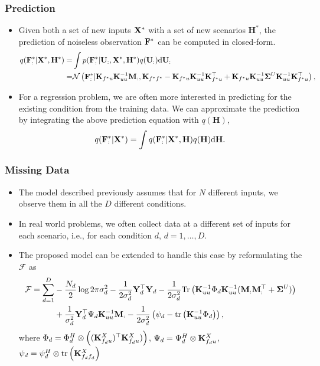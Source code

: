 \documentclass[aspectratio=169]{beamer}
\newcommand{\K}{\covarianceMatrix}
\newcommand{\yM}{\dataMatrix}
\newcommand{\fM}{\mappingFunctionMatrix}
\newcommand{\uM}{\inducingMatrix}
\newcommand{\xM}{\inputMatrix}
\newcommand{\mM}{\mathbf M}
\newcommand{\hM}{\mathbf H}
\newcommand{\sM}{\mathbf \Sigma}
\begin{document}
      \begin{frame}
    \frametitle{Prediction}
    \begin{itemize}
    \item Given both a set of new inputs $\xM^*$ with a set of new scenarios $\hM^*$, the prediction of noiseless observation $\fM^*$ can be computed in closed-form.
    \begin{align*}
q(\fM_{:}^* | \xM^*, \hM^*) =& \int p(\fM_{:}^* | \uM_{:},  \xM^*, \hM^*) q(\uM_{:}) \dif{\uM_{:}} \\
=& \gaussianDist{\fM_{:}^*}{\K_{f^* u}\K_{uu}^{-1}\mM_{:}}{\K_{f^*f^*}-\K_{f^*u}\K_{uu}^{-1}\K_{f^*u}^\top+\K_{f^* u}\K_{uu}^{-1}\sM^{U}\K_{uu}^{-1}\K_{f^* u}^\top},  
\end{align*}
    \item For a regression problem, we are often more interested in predicting for the existing condition from the training data. We can approximate the prediction by integrating the above prediction equation with $q(\hM)$,
\begin{align*}
q(\fM_{:}^* | \xM^*) = \int q(\fM_{:}^* | \xM^*, \hM) q(\hM) \dif{\hM}.
\end{align*}
  \end{itemize}
  \end{frame}

      \begin{frame}
    \frametitle{Missing Data}
    \begin{itemize}
    \item The model described previously assumes that for $N$ different inputs, we observe them in all the $D$ different conditions.
    \item In real world problems, we often collect data at a different set of inputs for each scenario, i.e., for each condition $d$, $d=1, \dots, D$.
    \item The proposed model can be extended to handle this case by reformulating the $\mathcal{F}$ as
\begin{align*}
\mathcal{F} = \sum_{d=1}^D
&-\frac{N_d}{2}\log 2\pi \sigma_d^2 -\frac{1}{2\sigma^2_d} \yM_d^\top\yM_d -\frac{1}{2\sigma^2_d}\Tr\left(\K^{-1}_{uu} \Phi_d \K^{-1}_{uu} (\mM_{:}\mM_{:}^\top+\sM^{U}) \right)  \nonumber\\
&+\frac{1}{\sigma^2_d}\yM_d^\top \Psi_d \K^{-1}_{uu} \mM_{:}  -\frac{1}{2\sigma^2_d} \left( \psi_d -\tr{\K^{-1}_{uu} \Phi_d} \right),
\end{align*}
where $\Phi_d = \Phi_d^H \otimes \left((\K^X_{f_du})^\top \K^X_{f_du}) \right)$, $\Psi_d = \Psi_d^H \otimes \K^X_{f_du}$, $\psi_d = \psi_d^H \otimes \tr{\K^X_{f_df_d}}$
  \end{itemize}
  \end{frame}
\end{document}
